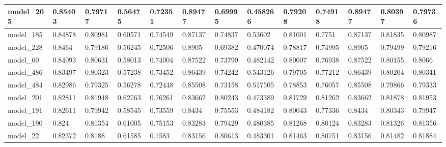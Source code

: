 \begin{tabular}{|l|l|l|l|l|l|l|l|l|l|l|l|l|}
model\_205     & 0.85403     & 0.79717        & 0.56475      & 0.72351          & 0.89477              & 0.69995              & 0.458266     & 0.79208           & 0.74918            & 0.89477         & 0.80397     & 0.79736      \\ \hline
model\_185     & 0.84878     & 0.80981        & 0.60571      & 0.74549          & 0.87137              & 0.74837              & 0.53602      & 0.81001           & 0.7751             & 0.87137         & 0.81835     & 0.80987      \\ \hline
model\_228     & 0.8464      & 0.79186        & 0.56245      & 0.72506          & 0.8905               & 0.69382              & 0.470074     & 0.78817           & 0.74995            & 0.8905          & 0.79499     & 0.79216      \\ \hline
model\_60      & 0.84093     & 0.80631        & 0.58013      & 0.74004          & 0.87522              & 0.73799              & 0.482142     & 0.80007           & 0.76938            & 0.87522         & 0.80155     & 0.8066       \\ \hline
model\_486     & 0.83497     & 0.80323        & 0.57238      & 0.73452          & 0.86439              & 0.74242              & 0.543126     & 0.79705           & 0.77212            & 0.86439         & 0.80204     & 0.80341      \\ \hline
model\_484     & 0.82986     & 0.79325        & 0.56278      & 0.72448          & 0.85508              & 0.73158              & 0.517505     & 0.78853           & 0.76057            & 0.85508         & 0.79866     & 0.79333      \\ \hline
model\_201     & 0.82811     & 0.81948        & 0.62763      & 0.76261          & 0.83662              & 0.80243              & 0.473389     & 0.81729           & 0.81262            & 0.83662         & 0.81878     & 0.81953      \\ \hline
model\_191     & 0.82611     & 0.79942        & 0.58545      & 0.73559          & 0.8434               & 0.75553              & 0.484182     & 0.80043           & 0.77336            & 0.8434          & 0.80343     & 0.79947      \\ \hline
model\_190     & 0.824       & 0.81354        & 0.61005      & 0.75153          & 0.83283              & 0.79429              & 0.480385     & 0.81268           & 0.80124            & 0.83283         & 0.81326     & 0.81356      \\ \hline
model\_22      & 0.82372     & 0.8188         & 0.61585      & 0.7583           & 0.83156              & 0.80613              & 0.483301     & 0.81463           & 0.80751            & 0.83156         & 0.81482     & 0.81884      \\ \hline

\end{tabular}
